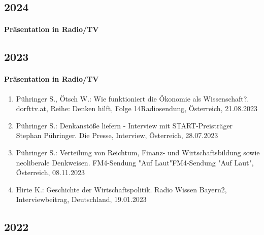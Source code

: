 \subsection*{2024}
\paragraph{Präsentation in Radio/TV}
\subsection*{2023}
\paragraph{Präsentation in Radio/TV}
\begin{enumerate}
	\item Pühringer S., Ötsch W.: Wie funktioniert die Ökonomie als Wissenschaft?. dorfttv.at, Reihe: Denken hilft, Folge 14Radiosendung, Österreich, 21.08.2023
	\item Pühringer S.: Denkanstöße liefern - Interview mit START-Preisträger Stephan Pühringer. Die Presse, Interview, Österreich, 28.07.2023
	\item Pühringer S.: Verteilung von Reichtum, Finanz- und Wirtschaftsbildung sowie neoliberale Denkweisen. FM4-Sendung "Auf Laut"FM4-Sendung "Auf Laut", Österreich, 08.11.2023
	\item Hirte K.: Geschichte der Wirtschaftspolitik. Radio Wissen Bayern2, Interviewbeitrag, Deutschland, 19.01.2023
\end{enumerate}
\subsection*{2022}
